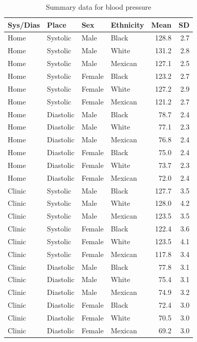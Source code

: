\documentclass[
]{article}
\begin{document}
\begin{table}[!h]

\caption{\label{tab:summaries}Summary data for blood pressure}
\centering
\begin{tabular}[t]{llllrr}
\toprule
Sys/Dias & Place & Sex & Ethnicity & Mean & SD\\
\midrule
Home & Systolic & Male & Black & 128.8 & 2.7\\
Home & Systolic & Male & White & 131.2 & 2.8\\
Home & Systolic & Male & Mexican & 127.1 & 2.5\\
Home & Systolic & Female & Black & 123.2 & 2.7\\
Home & Systolic & Female & White & 127.2 & 2.9\\
Home & Systolic & Female & Mexican & 121.2 & 2.7\\
\addlinespace
Home & Diastolic & Male & Black & 78.7 & 2.4\\
Home & Diastolic & Male & White & 77.1 & 2.3\\
Home & Diastolic & Male & Mexican & 76.8 & 2.4\\
Home & Diastolic & Female & Black & 75.0 & 2.4\\
Home & Diastolic & Female & White & 73.7 & 2.3\\
Home & Diastolic & Female & Mexican & 72.0 & 2.4\\
\addlinespace
Clinic & Systolic & Male & Black & 127.7 & 3.5\\
Clinic & Systolic & Male & White & 128.0 & 4.2\\
Clinic & Systolic & Male & Mexican & 123.5 & 3.5\\
Clinic & Systolic & Female & Black & 122.4 & 3.6\\
Clinic & Systolic & Female & White & 123.5 & 4.1\\
Clinic & Systolic & Female & Mexican & 117.8 & 3.4\\
\addlinespace
Clinic & Diastolic & Male & Black & 77.8 & 3.1\\
Clinic & Diastolic & Male & White & 75.4 & 3.1\\
Clinic & Diastolic & Male & Mexican & 74.9 & 3.2\\
Clinic & Diastolic & Female & Black & 72.4 & 3.0\\
Clinic & Diastolic & Female & White & 70.5 & 3.0\\
Clinic & Diastolic & Female & Mexican & 69.2 & 3.0\\
\bottomrule
\end{tabular}
\end{table}
\end{document}
